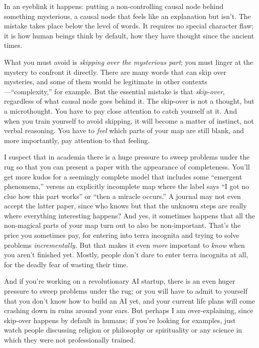 {
 In an eyeblink it happens: putting a non-controlling causal node
behind something mysterious, a causal node that feels like an
explanation but isn't. The mistake takes place below
the level of words. It requires no special character flaw; it is how
human beings think by default, how they have thought since the ancient
times.}

{
 What you must avoid is \textit{skipping over the mysterious part};
you must linger at the mystery to confront it directly. There are many
words that can skip over mysteries, and some of them would be
legitimate in other
contexts---``complexity,'' for
example. But the essential mistake is that \textit{skip-over},
regardless of what causal node goes behind it. The skip-over is not a
thought, but a microthought. You have to pay close attention to catch
yourself at it. And when you train yourself to avoid skipping, it will
become a matter of instinct, not verbal reasoning. You have to
\textit{feel} which parts of your map are still blank, and more
importantly, pay attention to that feeling.}

{
 I suspect that in academia there is a huge pressure to sweep
problems under the rug so that you can present a paper with the
appearance of completeness. You'll get more kudos for a
seemingly complete model that includes some ``emergent
phenomena,'' versus an explicitly incomplete map
where the label says ``I got no clue how this part
works'' or ``then a miracle
occurs.'' A journal may not even accept the latter
paper, since who knows but that the unknown steps are really where
everything interesting happens? And yes, it sometimes happens that all
the non-magical parts of your map turn out to also be non-important.
That's the price you sometimes pay, for entering into
terra incognita and trying to solve problems \textit{incrementally.}
But that makes it even \textit{more} important to \textit{know} when
you aren't finished yet. Mostly, people
don't dare to enter terra incognita at all, for the
deadly fear of wasting their time.}

{
 And if you're working on a revolutionary AI
startup, there is an even huger pressure to sweep problems under the
rug; or you will have to admit to yourself that you
don't know how to build an AI yet, and your current
life plans will come crashing down in ruins around your ears. But
perhaps I am over-explaining, since skip-over happens by default in
humans; if you're looking for examples, just watch
people discussing religion or philosophy or spirituality or any science
in which they were not professionally trained.}

